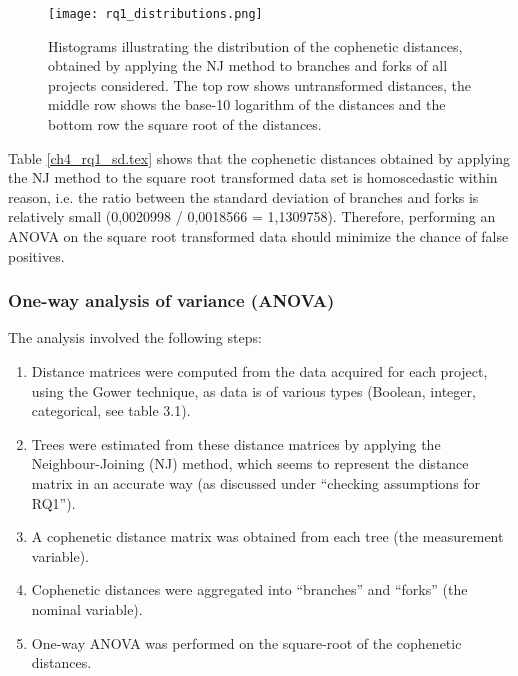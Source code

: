 \begin{figure}[H]
  \centering
  \texttt{[image: rq1\_distributions.png]}
  \caption{Histograms illustrating the distribution of the cophenetic distances, obtained by applying the NJ method to branches and forks of all projects considered. The top row shows untransformed distances, the middle row shows the base-10 logarithm of the distances and the bottom row the square root of the distances.}
  \label{fig:rq1_distributions}
\end{figure}

 Table \ref{ch4_rq1_sd.tex} shows that the cophenetic distances obtained by applying the NJ method to the square root transformed data set is homoscedastic within reason, i.e. the ratio between the standard deviation of branches and forks is relatively small (0,0020998 /  0,0018566 = 1,1309758). Therefore, performing an ANOVA on the square root transformed data should minimize the chance of false positives.



\subsubsection{One-way analysis of variance (ANOVA)}
The analysis involved the following steps:

\begin{enumerate}
\item{Distance matrices were computed from the data acquired for each project, using the Gower technique, as data is of various types (Boolean, integer, categorical, see table 3.1).}

\item{Trees were estimated from these distance matrices by applying the Neighbour-Joining (NJ) method, which seems to represent the distance matrix in an accurate way (as discussed under “checking assumptions for RQ1”).}
  
\item{A cophenetic distance matrix was obtained from each tree (the measurement variable).}
  
\item{Cophenetic distances were aggregated into “branches” and “forks” (the nominal variable).}

\item{One-way ANOVA was performed on the square-root of the cophenetic distances.}
\end{enumerate}

